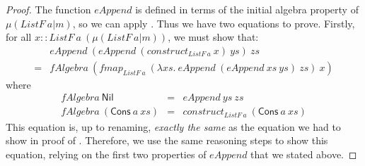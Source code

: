 \begin{proof}
  The function $\mathit{eAppend}$ is defined in terms of the initial
  algebra property of $\mu(\mathit{ListF}~a|m)$, so we can apply
  . Thus we have two equations to
  prove. Firstly, for all $x ::
  \mathit{ListF}~a~(\mu(\mathit{ListF}~a|m))$, we must show that:
  \begin{displaymath}
    \begin{array}{cl}
      &\mathit{eAppend}~(\mathit{eAppend}~(\mathit{construct}_{\mathit{ListF}~a}~x)~\mathit{ys})~\mathit{zs}\\
      =&\mathit{fAlgebra}~(\mathit{fmap}_{\mathit{ListF}~a}~(\lambda \mathit{xs}.~\mathit{eAppend}~(\mathit{eAppend}~\mathit{xs}~\mathit{ys})~\mathit{zs})~x)
    \end{array}
  \end{displaymath}
  where
  \begin{displaymath}
    \begin{array}{rcl}
      \mathit{fAlgebra}~\mathsf{Nil} &=& \mathit{eAppend}~\mathit{ys}~\mathit{zs} \\
      \mathit{fAlgebra}~(\mathsf{Cons}~a~\mathit{xs}) &=& \mathit{construct}_{\mathit{ListF}~a}~(\mathsf{Cons}~a~\mathit{xs})
    \end{array}
  \end{displaymath}
  This equation is, up to renaming, \emph{exactly the same} as the
  equation we had to show in proof of
  . Therefore, we use the same reasoning
  steps to show this equation, relying on the first two properties of
  $\mathit{eAppend}$ that we stated above.


\end{proof}
